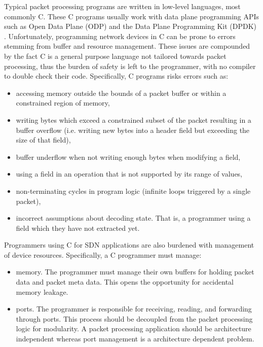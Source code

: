 Typical packet processing programs are written in low-level languages, most
commonly C. These C programs usually work with data plane programming APIs such
as Open Data Plane (ODP) \cite{odp_webpage} and the Data Plane Programming Kit
(DPDK) \cite{dpdk_webpage}. Unfortunately, programming network devices in C can be prone
to errors stemming from buffer and resource management. 
These issues are compounded by the fact C is a general
purpose language not tailored towards packet processing, thus the burden of
safety
is left to the programmer, with no compiler to double check their code.
Specifically, C programs risks errors such as:

\begin{itemize}
\item accessing memory outside the bounds of a packet buffer or within a
constrained
region of memory,

\item writing bytes which exceed a constrained subset of the packet
resulting in a buffer overflow (i.e. writing new bytes into a header field
but exceeding the size of that field),

\item buffer underflow when not writing enough bytes when modifying
a field,

\item using a field in an operation that is not supported by its
range of values,

\item non-terminating cycles in program logic (infinite loops
triggered by a single packet),

\item incorrect assumptions about decoding state. That is, a programmer using
a field which they have not extracted yet.
\end{itemize}

Programmers using C for SDN applications are also burdened with management of
device resources. Specifically, a C programmer must manage:

\begin{itemize}
\item memory. The programmer must manage their own buffers for holding packet
data and packet meta data. This opens the opportunity for accidental
memory leakage.

\item ports. The programmer is responsible for receiving, reading, and
forwarding
through ports. This process should be decoupled from the packet processing logic
for modularity. A packet processing application should be architecture
independent
whereas port management is a architecture dependent problem.
\end{itemize}

